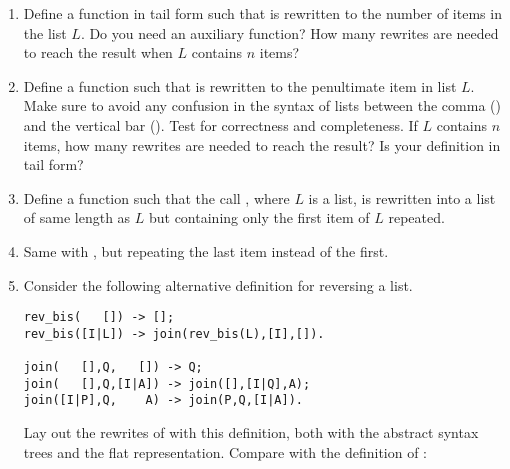 \begin{enumerate}

  \item Define a function  in tail form such that
     is rewritten to the number of items in
    the list \(L\). Do you need an auxiliary function? How many
    rewrites are needed to reach the result when \(L\) contains \(n\)
    items?

  \item Define a function  such that
     is rewritten to the penultimate item in
    list \(L\). Make sure to avoid any confusion in the syntax of
    lists between the comma (\erlcode{,}) and the vertical bar
    (\erlcode{|}). Test for correctness and completeness. If \(L\)
    contains \(n\) items, how many rewrites are needed to reach the
    result? Is your definition in tail form?

  \item Define a function  such that the call
    , where \(L\) is a list, is rewritten
    into a list of same length as \(L\) but containing only the first
    item of \(L\) repeated.

  \item Same with , but repeating the last item
    instead of the first.

  \item Consider the following alternative definition for reversing a list.
\begin{verbatim}
rev_bis(   []) -> [];
rev_bis([I|L]) -> join(rev_bis(L),[I],[]).

join(   [],Q,   []) -> Q;
join(   [],Q,[I|A]) -> join([],[I|Q],A);
join([I|P],Q,    A) -> join(P,Q,[I|A]).
\end{verbatim}
    Lay out the rewrites of  with this
    definition, both with the abstract syntax trees and the flat
    representation. Compare with the definition of :
     

\end{enumerate}
